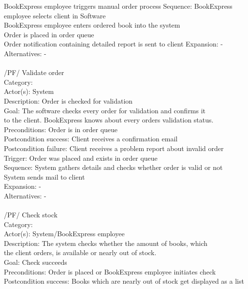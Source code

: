 \documentclass[11pt,a4paper,oneside,svgnames]{report}
\begin{document}
\begin{tabbing}
	 \> BookExpress employee triggers manual order process
	 Sequence: \> BookExpress employee selects client in Software\\
	 \> BookExpress employee enters ordered book into the system\\
	 \> Order is placed in order queue\\
	 \> Order notification containing detailed report is sent to client
	 Expansion: \> -\\
	 Alternatives: \> -\\
	 \\
	 /PF/ \> Validate order\\ 
	 Category: \> \\
	 Actor(s): \> System\\ 
	 Description: \> Order is checked for validation\\ 
	 Goal: \> The software checks every order for validation and confirms it\\
	 \> to the client. BookExpress knows about every orders validation status.\\
	 Preconditions: \> Order is in order queue\\
	 Postcondition success: \> Client receives a confirmation email\\
	 Postcondition failure: \> Client receives a problem report about invalid order\\
	 Trigger: \> Order was placed and exists in order queue\\
	 Sequence: \> System  gathers details and checks whether order is valid or not\\
	 \> System sends mail to client\\
	 Expansion: \> -\\
	 Alternatives: \> -\\
	 \\
	 /PF/ \> Check stock\\ 
	 Category: \> \\
	 Actor(s): \> System/BookExpress employee\\ 
	 Description: \> The system checks whether the amount of books, which\\
	 \> the client orders, is available or nearly out of stock.\\ 
	 Goal: \> Check succeeds\\
	 Preconditions: \> Order is placed or BookExpress employee initiates check\\
	 Postcondition success: \> Books which are nearly out of stock get displayed as a list\\

\end{tabbing}
\end{document}
